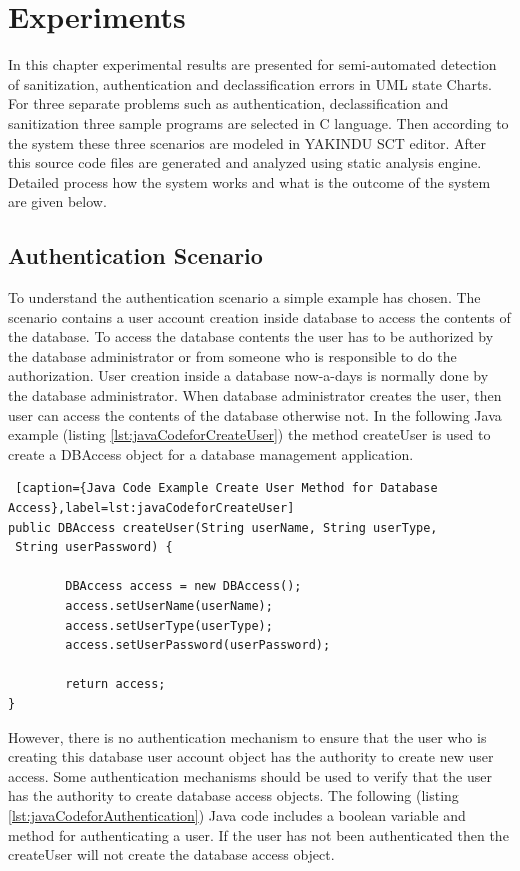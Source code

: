 \chapter{Experiments}
In this chapter experimental results are presented for semi-automated detection of sanitization, authentication and declassification errors in UML state Charts. For three separate problems such as authentication, declassification and sanitization three sample programs are selected in C language. Then according to the system these three scenarios are modeled in YAKINDU SCT editor. After this source code files are generated and analyzed using static analysis engine. Detailed process how the system works and what is the outcome of the system are given below.

\section{Authentication Scenario}

To understand the authentication scenario a simple example has chosen. The scenario contains a user account creation inside database to access the contents of the database. To access the database contents the user has to be authorized by the database administrator or from someone who is responsible to do the authorization. User creation inside a database now-a-days is normally done by the database administrator. When database administrator creates the user, then user can access the contents of the database otherwise not. In the following Java example (listing \ref{lst:javaCodeforCreateUser}) the method createUser is used to create a DBAccess object for a database management application.

\begin{lstlisting} [caption={Java Code Example Create User Method for Database Access},label=lst:javaCodeforCreateUser]
public DBAccess createUser(String userName, String userType,
 String userPassword) {

		DBAccess access = new DBAccess();
		access.setUserName(userName);
		access.setUserType(userType);
		access.setUserPassword(userPassword);	
				
		return access;
}

\end{lstlisting}

However, there is no authentication mechanism to ensure that the user who is creating this database user account object has the authority to create new user access. Some authentication mechanisms should be used to verify that the user has the authority to create database access objects.
The following (listing \ref{lst:javaCodeforAuthentication}) Java code includes a boolean variable and method for authenticating a user. If the user has not been authenticated then the createUser will not create the database access object.

